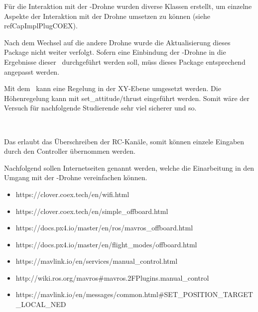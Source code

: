























Für die Interaktion mit der \COEX-Drohne wurden diverse Klassen erstellt, um einzelne Aspekte der Interaktion mit der Drohne umsetzen zu können (siehe refCap{ImplPlugCOEX}).

Nach dem Wechsel auf die andere Drohne wurde die Aktualisierung dieses Package nicht weiter verfolgt. Sofern eine Einbindung der \COEX-Drohne in die Ergebnisse dieser \Arbeit\ durchgeführt werden soll, müss dieses Package entsprechend angepasst werden.




Mit dem  \missing\ kann eine Regelung in der XY-Ebene umgesetzt werden. Die Höhenregelung kann mit set\_attitude/thrust eingeführt werden.
Somit wäre der Versuch für nachfolgende Studierende sehr viel sicherer und so.


\missing\


Das  erlaubt das Überschreiben der RC-Kanäle, somit können einzele Eingaben durch den Controller übernommen werden.
\missing\





Nachfolgend sollen Internetseiten genannt werden, welche die Einarbeitung in den Umgang mit der \COEX-Drohne vereinfachen können.

\begin{itemize}
\item https://clover.coex.tech/en/wifi.html

\item https://clover.coex.tech/en/simple\_offboard.html
\item https://docs.px4.io/master/en/ros/mavros\_offboard.html
\item https://docs.px4.io/master/en/flight\_modes/offboard.html

\item https://mavlink.io/en/services/manual\_control.html
\item http://wiki.ros.org/mavros\#mavros.2FPlugins.manual\_control

\item https://mavlink.io/en/messages/common.html\#SET\_POSITION\_TARGET\_LOCAL\_NED
\end{itemize}

